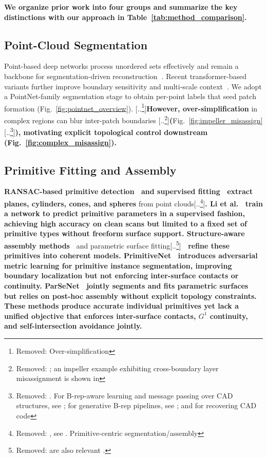 \documentclass{ieeeaccess}
\providecommand{\DIFaddtex}[1]{{\color{blue}\bfseries #1}} %
\providecommand{\DIFdeltex}[1]{{\color{red}[..\footnote{\color{black}Removed: #1}]}} %
\providecommand{\DIFaddbegin}{} %
\providecommand{\DIFaddend}{} %
\providecommand{\DIFdelbegin}{} %
\providecommand{\DIFdelend}{} %
\providecommand{\DIFadd}[1]{\texorpdfstring{\DIFaddtex{#1}}{#1}} %
\providecommand{\DIFdel}[1]{\texorpdfstring{\DIFdeltex{#1}}{}} %
\begin{document}
\DIFadd{We organize prior work into four groups and summarize the key
distinctions with our approach in Table~\ref{tab:method_comparison}.
}

\subsection{\DIFadd{Point-Cloud Segmentation}}
\DIFaddend Point-based deep networks process unordered sets effectively and remain a backbone for segmentation-driven reconstruction\DIFaddbegin \DIFadd{~}\DIFaddend \cite{b7,b8}. Recent transformer-based variants further improve boundary sensitivity and multi-scale context\DIFaddbegin \DIFadd{~}\DIFaddend \cite{b23}. We adopt a PointNet-family segmentation stage to obtain per-point labels that seed patch formation (Fig.~\ref{fig:pointnet_overview}). \DIFdelbegin \DIFdel{Over-simplification }\DIFdelend \DIFaddbegin \DIFadd{However, over-simplification }\DIFaddend in complex regions can blur inter-patch boundaries \DIFdelbegin \DIFdel{; an impeller example exhibiting cross-boundary layer misassignment is shown in }\DIFdelend \DIFaddbegin \DIFadd{(}\DIFaddend Fig.~\ref{fig:impeller_misassign}\DIFdelbegin \DIFdel{. For B-rep-aware learning and message passing over CAD structures, see \cite{b3,b9}; for generative B-rep pipelines, see \cite{b1,b4,b20}; and for recovering CAD code }\DIFdelend \DIFaddbegin \DIFadd{), motivating explicit topological control downstream (Fig.~\ref{fig:complex_misassign}).
}

\subsection{\DIFadd{Primitive Fitting and Assembly}}
\DIFadd{RANSAC-based primitive detection~\cite{b15} and supervised fitting~\cite{b27} extract planes, cylinders, cones, and spheres }\DIFaddend from point clouds\DIFdelbegin \DIFdel{, see \cite{b24}. Primitive-centric segmentation/assembly }\DIFdelend \DIFaddbegin \DIFadd{. Li et al.~\cite{b27} train a network to predict primitive parameters in a supervised fashion, achieving high accuracy on clean scans but limited to a fixed set of primitive types without freeform surface support. Structure-aware assembly methods~\cite{b14,b19} }\DIFaddend and parametric surface fitting\DIFdelbegin \DIFdel{are also relevant \cite{b14,b18,b19,b22}. }\DIFdelend \DIFaddbegin \DIFadd{~\cite{b22} refine these primitives into coherent models. PrimitiveNet~\cite{b28} introduces adversarial metric learning for primitive instance segmentation, improving boundary localization but not enforcing inter-surface contacts or continuity. ParSeNet~\cite{b19} jointly segments and fits parametric surfaces but relies on post-hoc assembly without explicit topology constraints. These methods produce accurate individual primitives yet lack a unified objective that enforces inter-surface contacts, $G^1$ continuity, and self-intersection avoidance jointly.
}
\end{document}
